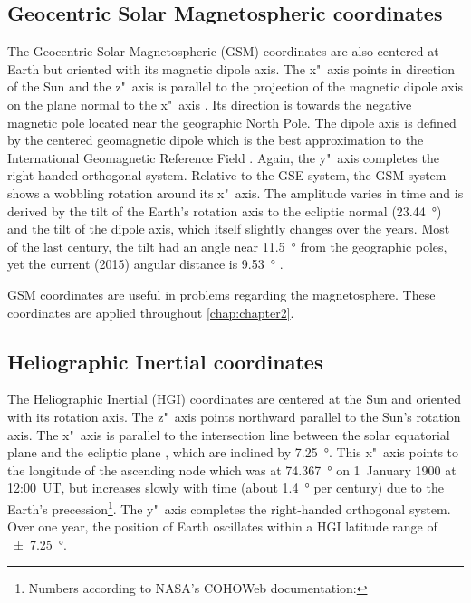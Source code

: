 \subsection*{Geocentric Solar Magnetospheric coordinates}
The Geocentric Solar Magnetospheric (GSM) coordinates are also centered at Earth but oriented with its magnetic dipole axis. The x"~axis points in direction of the Sun and the z"~axis is parallel to the projection of the magnetic dipole axis on the plane normal to the x"~axis \citep{Russell1971,Hapgood1992}. Its direction is towards the negative magnetic pole located near the geographic North Pole. The dipole axis is defined by the centered geomagnetic dipole which is the best approximation to the International Geomagnetic Reference Field \citep{Thebault2015}. Again, the y"~axis completes the right-handed orthogonal system.
Relative to the GSE system, the GSM system shows a wobbling rotation around its x"~axis. The amplitude varies in time and is derived by the tilt of the Earth's rotation axis to the ecliptic normal (\SI{23.44}{\degree}) and the tilt of the dipole axis, which itself slightly changes over the years. Most of the last century, the tilt had an angle near \SI{11.5}{\degree} from the geographic poles, yet the current (2015) angular distance is \SI{9.53}{\degree} \citep{Thebault2015}.

GSM coordinates are useful in problems regarding the magnetosphere. These coordinates are applied throughout \autoref{chap:chapter2}.

\pagebreak

\subsection*{Heliographic Inertial coordinates}
The Heliographic Inertial (HGI) coordinates are centered at the Sun and oriented with its rotation axis. The z"~axis points northward parallel to the Sun's rotation axis. The x"~axis is parallel to the intersection line between the solar equatorial plane and the ecliptic plane \citep{Burlaga1984a}, which are inclined by \SI{7.25}{\degree}. This x"~axis points to the longitude of the ascending node which was at \SI{74.367}{\degree} on 1~January 1900 at 12:00~UT, but increases slowly with time (about \SI{1.4}{\degree} per century) due to the Earth's precession\footnote{Numbers according to NASA's COHOWeb documentation: }. The y"~axis completes the right-handed orthogonal system.
Over one year, the position of Earth oscillates within a HGI latitude range of \SI{+-7.25}{\degree}.

